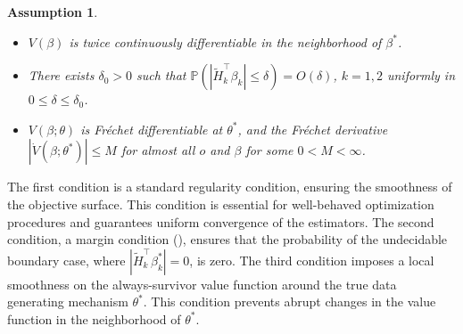 \documentclass{article}
\newcommand{\wt}{\widetilde}
\newcommand{\pr}{\mathbb{P}}
\newtheorem{assumption}{Assumption}
\begin{document}
\begin{assumption} \ \label{A11}
	\begin{itemize}
	\item[(i)] $V(\beta)$ is twice continuously differentiable in the neighborhood of $\beta^*$.
	\item[(ii)] There exists $\delta_0 > 0$ such that $\pr(|\wt H_k^\intercal \beta_k| \le \delta) = O(\delta)$, $k=1,2$ uniformly in $0\le \delta\le \delta_0$.
	\item[(iii)] $V(\beta;\theta)$ is Fr\'echet differentiable at $\theta^*$, and the Fr\'echet derivative $|\dot V(\beta;\theta^*)| \le M$ for almost all $o$ and $\beta$ for some $0<M<\infty$.
	\end{itemize}
\end{assumption}
%
The first condition is a standard regularity condition, ensuring the smoothness of the objective surface. This condition is essential for well-behaved optimization procedures and guarantees uniform convergence of the estimators. 
The second condition, a margin condition (\citealp{luedtke2016statistical}), ensures that the probability of the undecidable boundary case, where $|\tilde{H}_k^\intercal \beta_k^*| = 0$, is zero.
The third condition imposes a local smoothness on the always-survivor value function around the true data generating mechanism $\theta^*$. This condition prevents abrupt changes in the value function in the neighborhood of $\theta^*$.
\end{document}
